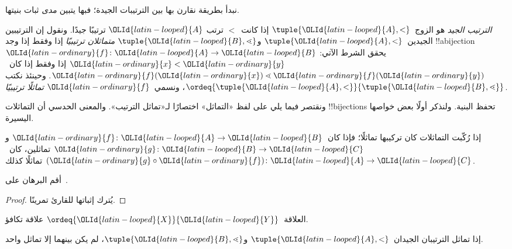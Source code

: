 \documentclass[../../../include/open-logic-section]{subfiles}
\begin{document}

نبدأ بطريقة نقارن بها بين الترتيبات الجيدة؛ فبها يتبين \emph{مدى}
ثبات بنيتها.

\begin{defn}
\emph{الترتيب الجيد} هو الزوج~$\tuple{\OLId{latin-looped}{A}, <}$ إذا كانت~$<$ ترتب
$\OLId{latin-looped}{A}$ ترتيبًا جيدًا. ونقول إن الترتيبين الجيدين~$\tuple{\OLId{latin-looped}{A}, <}$
و$\tuple{\OLId{latin-looped}{B}, \lessdot}$ \emph{متماثلان ترتيبيًا} إذا وفقط إذا وجد
!!a{bijection}~$\OLId{latin-ordinary}{f} \colon \OLId{latin-looped}{A} \to \OLId{latin-looped}{B}$ يحقق الشرط الآتي: $\OLId{latin-ordinary}{x} < \OLId{latin-ordinary}{y}$ إذا
وفقط إذا كان~$\OLId{latin-ordinary}{f}(\OLId{latin-ordinary}{x}) \lessdot \OLId{latin-ordinary}{f}(\OLId{latin-ordinary}{y})$. وحينئذ نكتب
$\ordeq{\tuple{\OLId{latin-looped}{A}, <}}{\tuple{\OLId{latin-looped}{B}, \lessdot}}$، ونسمي~$\OLId{latin-ordinary}{f}$
\emph{تماثلًا ترتيبيًا}.
\end{defn}
\noindent
ونقتصر فيما يلي على لفظ «التماثل» اختصارًا لـ«تماثل الترتيب». والمعنى
الحدسي أن التماثلات !!{bijection}s تحفظ البنية. ولنذكر أولًا بعض
خواصها اليسيرة.

\begin{lem}
إذا رُكّبت التماثلات كان تركيبها تماثلًا؛ فإذا كان~$\OLId{latin-ordinary}{f} \colon \OLId{latin-looped}{A} \to \OLId{latin-looped}{B}$
و$\OLId{latin-ordinary}{g} \colon \OLId{latin-looped}{B} \to \OLId{latin-looped}{C}$ تماثلين، كان~$(\OLId{latin-ordinary}{g} \circ \OLId{latin-ordinary}{f}) \colon \OLId{latin-looped}{A} \to \OLId{latin-looped}{C}$
تماثلًا كذلك.
\end{lem}
\begin{prob}
أقم البرهان على~.
\end{prob}
\begin{proof}
يُترك إثباتها للقارئ تمرينًا.
\end{proof}
\begin{cor}
العلاقة~$\ordeq{\OLId{latin-looped}{X}}{\OLId{latin-looped}{Y}}$ علاقة تكافؤ.
\end{cor}
\begin{prop}
إذا تماثل الترتيبان الجيدان~$\tuple{\OLId{latin-looped}{A}, <}$ و$\tuple{\OLId{latin-looped}{B}, \lessdot}$،
لم يكن بينهما إلا تماثل واحد.
\end{prop}
\end{document}
